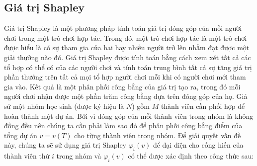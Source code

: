 \subsection{Giá trị Shapley}
Giá trị Shapley \cite{winter2002shapley} là một phương pháp tính toán giá trị đóng góp của mỗi người chơi trong một trò chơi hợp tác. Trong đó, một trò chơi hợp tác là một trò chơi được hiểu là có sự tham gia của hai hay nhiều người trở lên nhằm đạt được một giải thưởng nào đó. Giá trị Shapley được tính toán bằng cách xem xét tất cả các tổ hợp có thể có của các người chơi và tính toán trung bình tất cả sự tăng giá trị phần thưởng trên tất cả mọi tổ hợp người chơi mỗi khi có người chơi mới tham gia vào. Kết quả là một phân phối công bằng của giá trị tạo ra, trong đó mỗi người chơi nhận được một phần trăm công bằng dựa trên đóng góp của họ.
\bigbreak\noindent
Giả sử một nhóm học sinh (được ký hiệu là $N$) gồm $M$ thành viên cần phối hợp để hoàn thành một dự án. Bởi vì đóng góp của mỗi thành viên trong nhóm là không đồng đều nên chúng ta cần phải làm sao đó để phân phối công bằng điểm của tổng dự án $v=v(T)$ cho từng thành viên trong nhóm. Để giải quyết vấn đề này, chúng ta sẽ sử dụng giá trị Shapley $\varphi_i(v)$ để đại diện cho cống hiến của thành viên thứ $i$ trong nhóm và $\varphi_i(v)$ có thể được xác định theo công thức sau:





